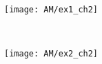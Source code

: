 \begin{example}\label{AKM_ch2_ex1}
	\
	
	\begin{figure}[H]
		\texttt{[image: AM/ex1\_ch2]}
	\end{figure}
\end{example}
%
%
%
%
%
%
%
%
%
%
%
%
%
%
%
%
%

\begin{example}\label{AKM_ch2_ex2}
	\

	\begin{figure}[H]
		\texttt{[image: AM/ex2\_ch2]}
	\end{figure}
\end{example}

